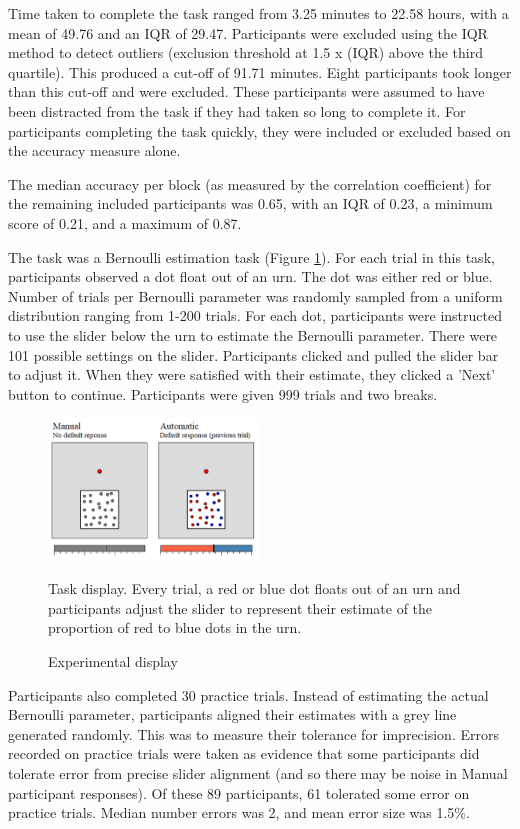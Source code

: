\documentclass[sn-apa]{sn-jnl}\usepackage[]{graphicx}\usepackage[]{xcolor}
\begin{document}
Time taken to complete the task ranged from 3.25 minutes to 22.58 hours, with a mean of 49.76 and an IQR of 29.47. Participants were excluded using the IQR method to detect outliers (exclusion threshold at 1.5 x (IQR) above the third quartile). This produced a cut-off of 91.71 minutes. Eight participants took longer than this cut-off and were excluded. These participants were assumed to have been distracted from the task if they had taken so long to complete it. For participants completing the task quickly, they were included or excluded based on the accuracy measure alone. 

The median accuracy per block (as measured by the correlation coefficient) for the remaining included participants was 0.65, with an IQR of 0.23, a minimum score of 0.21, and a maximum of 0.87. 

The task was a Bernoulli estimation task (Figure \ref{fig:taskdisplay}). For each trial in this task, participants observed a dot float out of an urn. The dot was either red or blue. Number of trials per Bernoulli parameter was randomly sampled from a uniform distribution ranging from 1-200 trials. For each dot, participants were instructed to use the slider below the urn to estimate the Bernoulli parameter. There were 101 possible settings on the slider. Participants clicked and pulled the slider bar to adjust it. When they were satisfied with their estimate, they clicked a 'Next' button to continue. Participants were given 999 trials and two breaks.

\begin{figure}[htp] 
    \centering
    \includegraphics[width=0.50\textwidth]{trial-design}
    \caption{Experimental display}{Task display. Every trial, a red or blue dot floats out of an urn and participants adjust the slider to represent their estimate of the proportion of red to blue dots in the urn.}
    \label{fig:taskdisplay}
\end{figure}



Participants also completed 30 practice trials. Instead of estimating the actual Bernoulli parameter, participants aligned their estimates with a grey line generated randomly. This was to measure their tolerance for imprecision. Errors recorded on practice trials were taken as evidence that some participants did tolerate error from precise slider alignment (and so there may be noise in Manual participant responses).  Of these 89 participants, 61 tolerated some error on practice trials. Median number errors was 2, and mean error size was 1.5\%.
\end{document}
